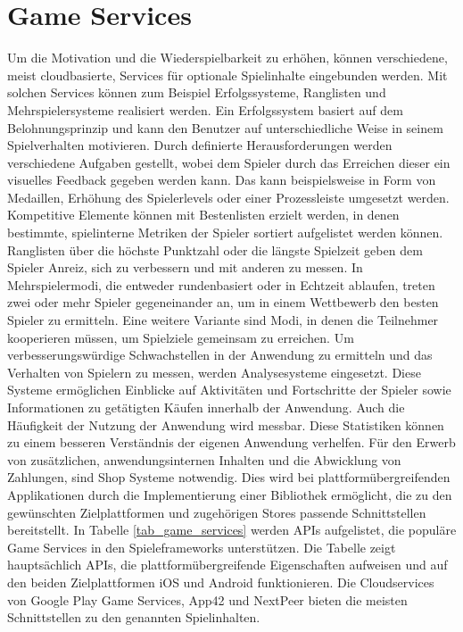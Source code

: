 \section{Game Services}
Um die Motivation und die Wiederspielbarkeit zu erhöhen, können verschiedene, meist cloudbasierte, Services für optionale Spielinhalte eingebunden werden. Mit solchen Services können zum Beispiel Erfolgssysteme, Ranglisten und Mehrspielersysteme realisiert werden.
Ein Erfolgssystem basiert auf dem Belohnungsprinzip und kann den Benutzer auf unterschiedliche Weise in seinem Spielverhalten motivieren. Durch definierte Herausforderungen werden verschiedene Aufgaben gestellt, wobei dem Spieler durch das Erreichen dieser ein visuelles Feedback gegeben werden kann. Das kann beispielsweise in Form von Medaillen, Erhöhung des Spielerlevels oder einer Prozessleiste umgesetzt werden. Kompetitive Elemente können mit Bestenlisten erzielt werden, in denen bestimmte, spielinterne Metriken der Spieler sortiert aufgelistet werden können. Ranglisten über die höchste Punktzahl oder die längste Spielzeit geben dem Spieler Anreiz, sich zu verbessern und mit anderen zu messen. 
In Mehrspielermodi, die entweder rundenbasiert oder in Echtzeit ablaufen, treten zwei oder mehr Spieler gegeneinander an, um in einem Wettbewerb den besten Spieler zu ermitteln. Eine weitere Variante sind Modi, in denen die Teilnehmer kooperieren müssen, um Spielziele gemeinsam zu erreichen.
Um verbesserungswürdige Schwachstellen in der Anwendung zu ermitteln und das Verhalten von Spielern zu messen, werden Analysesysteme eingesetzt. Diese Systeme ermöglichen Einblicke auf Aktivitäten und Fortschritte der Spieler sowie Informationen zu getätigten Käufen innerhalb der Anwendung. Auch die Häufigkeit der Nutzung der Anwendung wird messbar. Diese Statistiken können zu einem besseren Verständnis der eigenen Anwendung verhelfen.
Für den Erwerb von zusätzlichen, anwendungsinternen Inhalten und die Abwicklung von Zahlungen, sind Shop Systeme notwendig. Dies wird bei plattformübergreifenden Applikationen durch die Implementierung einer Bibliothek ermöglicht, die zu den gewünschten Zielplattformen und zugehörigen Stores passende Schnittstellen bereitstellt. 
In Tabelle \ref{tab_game_services} werden APIs aufgelistet, die populäre Game Services in den Spieleframeworks unterstützen. Die Tabelle zeigt hauptsächlich APIs, die plattformübergreifende Eigenschaften aufweisen und auf den beiden Zielplattformen iOS und Android funktionieren. Die Cloudservices von Google Play Game Services, App42 und NextPeer bieten die meisten Schnittstellen zu den genannten Spielinhalten.

